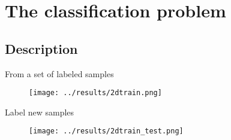 \section{The classification problem}

\subsection{Description}

\begin{frame}{From a set of labeled samples}
  \begin{figure}[!htbp]
    \centering
    \texttt{[image: ../results/2dtrain.png]}
  \end{figure}

%
%
%
%


\end{frame}

\begin{frame}{Label new samples}
  \begin{figure}[!htbp]
    \centering
    \texttt{[image: ../results/2dtrain\_test.png]}
  \end{figure}
\end{frame}

